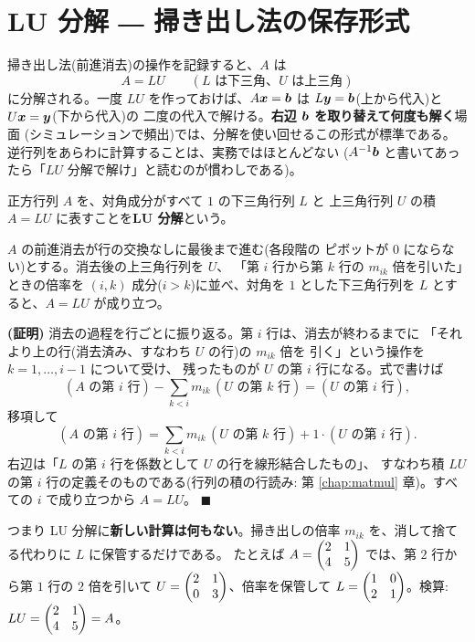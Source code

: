 \section{LU 分解 ― 掃き出し法の保存形式}

掃き出し法(前進消去)の操作を記録すると、$A$ は
\[
A = LU \qquad (L \text{ は下三角、} U \text{ は上三角})
\]
に分解される。一度 $LU$ を作っておけば、$A\bm{x} = \bm{b}$ は
$L\bm{y} = \bm{b}$(上から代入)と $U\bm{x} = \bm{y}$(下から代入)の
二度の代入で解ける。\textbf{右辺 $\bm{b}$ を取り替えて何度も解く}場面
(シミュレーションで頻出)では、分解を使い回せるこの形式が標準である。
逆行列をあらわに計算することは、実務ではほとんどない
($A^{-1}\bm{b}$ と書いてあったら「$LU$ 分解で解け」と読むのが慣わしである)。

\begin{teigi}[LU 分解]\label{def:num-lu}
正方行列 $A$ を、対角成分がすべて $1$ の下三角行列 $L$ と
上三角行列 $U$ の積 $A = LU$ に表すことを\textbf{LU 分解}という。
\end{teigi}

\begin{teiri}\label{thm:num-lu}
$A$ の前進消去が行の交換なしに最後まで進む(各段階の
ピボットが $0$ にならない)とする。消去後の上三角行列を $U$、
「第 $i$ 行から第 $k$ 行の $m_{ik}$ 倍を引いた」ときの倍率を
$(i, k)$ 成分($i > k$)に並べ、対角を $1$ とした下三角行列を
$L$ とすると、$A = LU$ が成り立つ。
\end{teiri}

\noindent\textbf{(証明)}\quad
消去の過程を行ごとに振り返る。第 $i$ 行は、消去が終わるまでに
「それより上の行(消去済み、すなわち $U$ の行)の $m_{ik}$ 倍を
引く」という操作を $k = 1, \dots, i - 1$ について受け、
残ったものが $U$ の第 $i$ 行になる。式で書けば
\[
(A \text{ の第 } i \text{ 行})
- \sum_{k < i} m_{ik}\,(U \text{ の第 } k \text{ 行})
= (U \text{ の第 } i \text{ 行}),
\]
移項して
\[
(A \text{ の第 } i \text{ 行})
= \sum_{k < i} m_{ik}\,(U \text{ の第 } k \text{ 行})
+ 1 \cdot (U \text{ の第 } i \text{ 行}).
\]
右辺は「$L$ の第 $i$ 行を係数として $U$ の行を線形結合したもの」、
すなわち積 $LU$ の第 $i$ 行の定義そのものである(行列の積の行読み:
第 \ref{chap:matmul} 章)。すべての $i$ で成り立つから $A = LU$。
$\blacksquare$

つまり LU 分解に\textbf{新しい計算は何もない}。掃き出しの倍率
$m_{ik}$ を、消して捨てる代わりに $L$ に保管するだけである。
たとえば $A = \begin{pmatrix}2 & 1 \\ 4 & 5\end{pmatrix}$ では、第 $2$ 行から第 $1$ 行の
$2$ 倍を引いて $U = \begin{pmatrix}2 & 1 \\ 0 & 3\end{pmatrix}$、倍率を保管して
$L = \begin{pmatrix}1 & 0 \\ 2 & 1\end{pmatrix}$。検算:
$LU = \begin{pmatrix}2 & 1 \\ 4 & 5\end{pmatrix} = A$。

